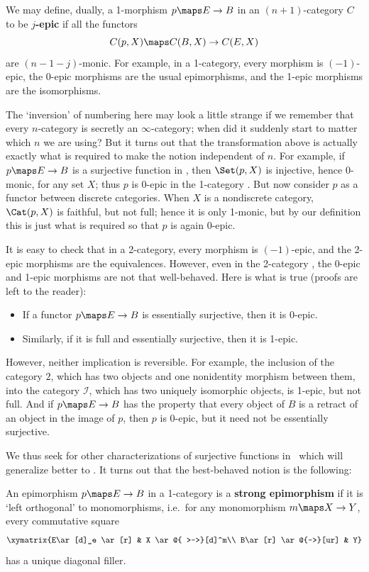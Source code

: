 \documentclass{amsart}
\begin{document}
We may define, dually, a 1-morphism $p\maps E\to B$ in an
$(n+1)$-category $C$ to be \textbf{$j$-epic} if all the functors
\[C(p,X)\maps C(B,X) \to C(E,X)
\]
are $(n-1-j)$-monic.  For example, in a 1-category, every morphism is
$(-1)$-epic, the 0-epic morphisms are the usual epimorphisms, and the
1-epic morphisms are the isomorphisms.

The `inversion' of numbering here may look a little strange if we
remember that every $n$-category is secretly an $\infty$-category;
when did it suddenly start to matter which $n$ we are using?  But it
turns out that the transformation above is actually exactly what is
required to make the notion independent of $n$.  For example, if
$p\maps E\to B$ is a surjective function in \Set, then $\Set(p,X)$ is
injective, hence 0-monic, for any set $X$; thus $p$ is 0-epic in the
1-category \Set.  But now consider $p$ as a functor between discrete
categories.  When $X$ is a nondiscrete category, $\Cat(p,X)$ is
faithful, but not full; hence it is only 1-monic, but by our
definition this is just what is required so that $p$ is again 0-epic.

It is easy to check that in a 2-category, every morphism is
$(-1)$-epic, and the 2-epic morphisms are the equivalences.  However,
even in the 2-category \Cat, the 0-epic and 1-epic morphisms are not
that well-behaved.  Here is what is true (proofs are left to the
reader):
\begin{itemize}
\item If a functor $p\maps E\to B$ is essentially surjective, then it
  is 0-epic.
\item Similarly, if it is full and essentially surjective, then it is
  1-epic.
\end{itemize}

However, neither implication is reversible.  For example, the
inclusion of the category $2$, which has two objects and one
nonidentity morphism between them, into the category $\mathscr{I}$,
which has two uniquely isomorphic objects, is 1-epic, but not full.
And if $p\maps E\to B$ has the property that every object of $B$ is a
retract of an object in the image of $p$, then $p$ is 0-epic, but it
need not be essentially surjective.

We thus seek for other characterizations of surjective functions in
\Set\ which will generalize better to \Cat.  It turns out that the
best-behaved notion is the following:

\begin{defn}
  An epimorphism $p\maps E\to B$ in a 1-category is a \textbf{strong
    epimorphism} if it is `left orthogonal' to monomorphisms, i.e.\
  for any monomorphism $m\maps X\to Y$, every commutative square
  \[\xymatrix{E\ar[d]_e \ar[r] & X \ar@{ >->}[d]^m\\ B\ar[r] \ar@{-->}[ur] & Y}\]
  has a unique diagonal filler.  
\end{defn}
\end{document}
